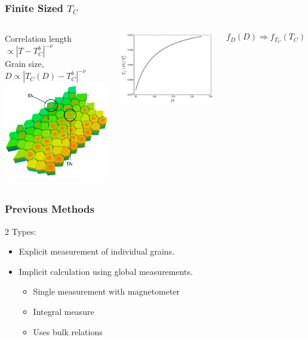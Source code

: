 \documentclass{beamer}
\begin{document}
\begin{frame}
	\frametitle{Finite Sized $T_C$}
	\begin{columns}
		\column{6cm}
		\begin{center}
		Correlation length $\propto |T-T_C^b|^{-\nu}$ \\ \vspace{3mm}
		Grain size, $D \propto |T_C(D)-T_C^b|^{-\nu}$ \\ \vspace{3mm}
		\includegraphics[width=5cm]{Images/grains2}
		\end{center}
		\column{6cm}
		\begin{center}
		\includegraphics[width=5cm]{Images/TcD}
		\end{center} \vspace{4mm}
		$$
		f_D(D) \Longrightarrow f_{T_C}(T_C)
		$$
	\end{columns}
\end{frame}

\begin{frame}
	\frametitle{Previous Methods}
	2 Types:
	\vspace{4mm}
	\begin{itemize}
		\item{Explicit measurement of individual grains.\footnotemark[3]}
		\vspace{4mm}
		\item{Implicit calculation using global measurements.\footnotemark[4]}
		\begin{itemize}
			\item{Single measurement with magnetometer}
			\item{Integral measure}
			\item{Uses bulk relations}
		\end{itemize}
	\end{itemize}	
\end{frame}
\end{document}
